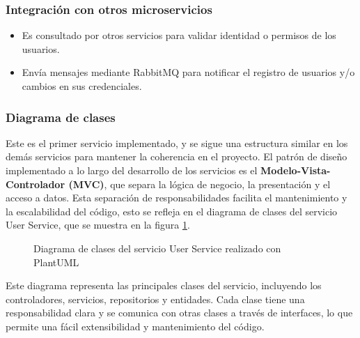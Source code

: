 \subsubsection{Integración con otros microservicios}

\begin{itemize}
  \item Es consultado por otros servicios para validar identidad o permisos de los usuarios.
  \item Envía mensajes mediante RabbitMQ para notificar el registro de usuarios y/o cambios en sus credenciales.
\end{itemize}

\subsubsection{Diagrama de clases}
Este es el primer servicio implementado, y se sigue una estructura similar en los demás servicios para mantener la coherencia en el proyecto. El patrón de diseño implementado a lo largo del desarrollo de los servicios es el \textbf{Modelo-Vista-Controlador (MVC)}, que separa la lógica de negocio, la presentación y el acceso a datos. Esta separación de responsabilidades facilita el mantenimiento y la escalabilidad del código, esto se refleja en el diagrama de clases del servicio User Service, que se muestra en la figura \ref{fig:user-service-class-diagram}.
\begin{figure}[H]
    \centering
    \caption{Diagrama de clases del servicio User Service realizado con PlantUML}
    \label{fig:user-service-class-diagram}
\end{figure}

Este diagrama representa las principales clases del servicio, incluyendo los controladores, servicios, repositorios y entidades. Cada clase tiene una responsabilidad clara y se comunica con otras clases a través de interfaces, lo que permite una fácil extensibilidad y mantenimiento del código.

